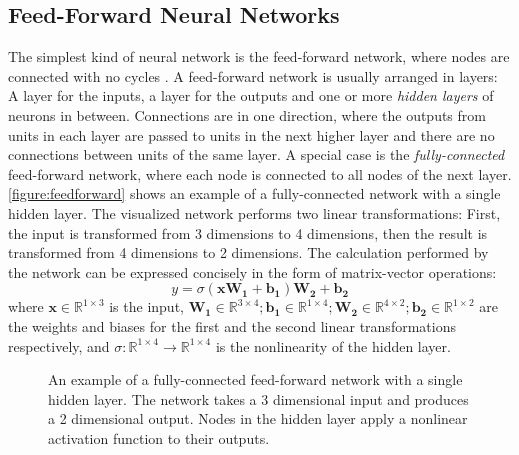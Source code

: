\subsection{Feed-Forward Neural Networks}
The simplest kind of neural network is the 
feed-forward network, where nodes are 
connected with no cycles \parencite{jurafsky}. A feed-forward network
is usually arranged in layers: A layer for the inputs, 
a layer for the outputs and one or more \textit{hidden layers} of 
neurons in between. Connections are in one direction, where 
the outputs from units in each layer are passed to 
units in the next higher layer and there are no connections 
between units of the same layer. A special case is the 
\textit{fully-connected} feed-forward network, where each node
is connected to all nodes of the next layer. 
\autoref{figure:feedforward} shows an example of a fully-connected
network with a single hidden layer. The visualized network 
performs two linear transformations: First, the input is transformed 
from 3 dimensions to 4 dimensions, then the result is transformed 
from 4 dimensions to 2 dimensions. The calculation performed by the 
network can be expressed concisely in the form of matrix-vector 
operations:
\begin{equation} \label{equation:feedforward}
    y = \sigma(\mathbf{x}\mathbf{W_1} + \mathbf{b_1})\mathbf{W_2} + \mathbf{b_2}
\end{equation}
where \(\mathbf{x} \in \mathbb{R}^{1 \times 3}\) is the input,
\(\mathbf{W_1} \in \mathbb{R}^{3 \times 4}; 
\mathbf{b_1} \in \mathbb{R}^{1 \times 4};
\mathbf{W_2} \in \mathbb{R}^{4 \times 2}; 
\mathbf{b_2} \in \mathbb{R}^{1 \times 2}\) are the weights and 
biases for the first and the second linear transformations 
respectively, and 
\(\sigma: \mathbb{R}^{1 \times 4}\rightarrow \mathbb{R}^{1 \times 4}\)
is the nonlinearity of the hidden layer.

\begin{figure}
    \centering
    
    \caption[Example of a fully-connected feed-forward network]{An example of a fully-connected feed-forward network
    with a single hidden layer. The network takes 
    a 3 dimensional input and produces a 2 dimensional output. Nodes 
    in the hidden layer apply a nonlinear activation function to 
    their outputs.}
    \label{figure:feedforward}
\end{figure}

